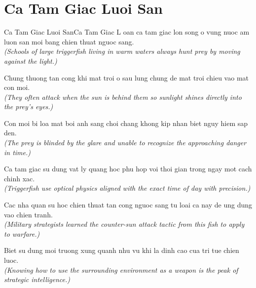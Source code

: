 \section{Ca Tam Giac Luoi San}
\begin{truyen}{Ca Tam Giac Luoi San}{Ca Tam Giac}
L oan ca tam giac lon song o vung nuoc am luon san moi bang chien thuat nguoc sang.\\
\textit{(Schools of large triggerfish living in warm waters always hunt prey by moving against the light.)}

Chung thuong tan cong khi mat troi o sau lung chung de mat troi chieu vao mat con moi.\\
\textit{(They often attack when the sun is behind them so sunlight shines directly into the prey's eyes.)}

Con moi bi loa mat boi anh sang choi chang khong kip nhan biet nguy hiem sap den.\\
\textit{(The prey is blinded by the glare and unable to recognize the approaching danger in time.)}

Ca tam giac su dung vat ly quang hoc phu hop voi thoi gian trong ngay mot cach chinh xac.\\
\textit{(Triggerfish use optical physics aligned with the exact time of day with precision.)}

Cac nha quan su hoc chien thuat tan cong nguoc sang tu loai ca nay de ung dung vao chien tranh.\\
\textit{(Military strategists learned the counter-sun attack tactic from this fish to apply to warfare.)}

\end{truyen}
\begin{baihoc}
  Biet su dung moi truong xung quanh nhu vu khi la dinh cao cua tri tue chien luoc.\\
  \textit{(Knowing how to use the surrounding environment as a weapon is the peak of strategic intelligence.)}
\end{baihoc}

